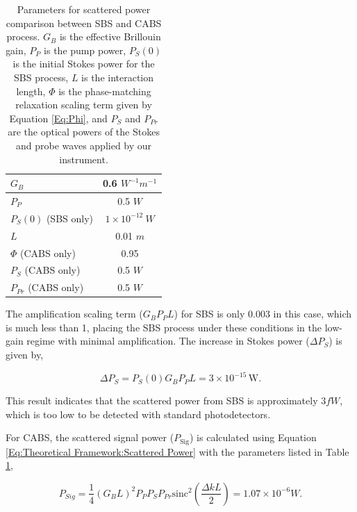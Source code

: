 \documentclass[%
  reprint,
  superscriptaddress,
  amsmath,amssymb,
  aps,
  prapplied,
]{revtex4-2}
\begin{document}
\begin{table}[h]
  \centering
  \renewcommand{\arraystretch}{1.2}
  \begin{tabular}{|l|c|}
    \hline
    $G_{B}$ & 0.6 $W^{-1} m^{-1}$ \\
    \hline
    $P_{P}$ & 0.5 $W$ \\
    \hline
    $P_{S}(0)$ (SBS only) & $1 \times 10^{-12} \ W$ \\
    \hline
    $L$ & 0.01 $m$ \\
    \hline
    $\Phi$ (CABS only) & 0.95 \\
    \hline
    $P_{S}$ (CABS only) & 0.5 $W$ \\
    \hline
    $P_{Pr}$ (CABS only) & 0.5 $W$ \\
    \hline
  \end{tabular}
  \caption{Parameters for scattered power comparison between SBS and CABS process. $G_{B}$ is the effective Brillouin gain, $P_{P}$ is the pump power, $P_{S}(0)$ is the initial Stokes power for the SBS process, $L$ is the interaction length, $\Phi$ is the phase-matching relaxation scaling term given by Equation \ref{Eq:Phi}, and $P_{S}$ and $P_{Pr}$ are the optical powers of the Stokes and probe waves applied by our instrument.}
  \label{tab:SBS Comparison Parameters}
\end{table}

The amplification scaling term ($G_{B}P_{P}L$) for SBS is only 0.003 in this case, which is much less than 1, placing the SBS process under these conditions in the low-gain regime with minimal amplification. The increase in Stokes power ($\Delta P_{S}$) is given by,

\begin{equation}
\Delta P_{S} = P_{S}(0)G_{B}P_{P}L = 3 \times 10^{-15}\, \text{W}.
\end{equation}

This result indicates that the scattered power from SBS is approximately $3 fW$, which is too low to be detected with standard photodetectors.

For CABS, the scattered signal power ($P_{\text{Sig}}$) is calculated using Equation \ref{Eq:Theoretical Framework:Scattered Power} with the parameters listed in Table \ref{tab:SBS Comparison Parameters},

\begin{equation}
P_{Sig} = \frac{1}{4}\left(G_{B}L\right)^{2}P_{P}P_{S}P_{Pr}\text{sinc}^{2}\left(\frac{\Delta k L}{2}\right) = 1.07\times10^{-6} W.
\end{equation}
\end{document}
